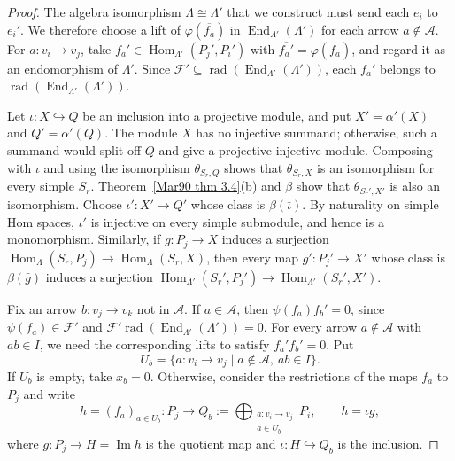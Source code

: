\documentclass[11pt]{article}
\newcommand{\rad}{\operatorname{rad}}
\newcommand{\Hom}{\operatorname{Hom}}
\newcommand{\End}{\operatorname{End}}
\renewcommand{\Im}{\operatorname{Im}}
\renewcommand{\cal}[1]{\mathcal #1}   %
\providecommand{\varLambda}{\Lambda}
\theoremstyle{definition}
\begin{document}
\begin{proof}
			The algebra isomorphism $\varLambda\cong\varLambda'$ that we construct must send each $e_i$ to $e_i'$.
			We therefore choose a lift of $\varphi(\overline{f_a})$ in $\End_{\varLambda'}(\varLambda')$ for each arrow $a\notin\cal{A}$.
			For $a:v_i\to v_j$, take $f_a'\in\Hom_{\varLambda'}(P_j',P_i')$ with $\overline{f_a'}=\varphi(\overline{f_a})$, and regard it as an endomorphism of $\varLambda'$.
			Since $\cal{F}'\subseteq\rad(\End_{\varLambda'}(\varLambda'))$, each $f_a'$ belongs to $\rad(\End_{\varLambda'}(\varLambda'))$.

			Let $\iota:X\hookrightarrow Q$ be an inclusion into a projective module, and put $X'=\alpha'(X)$ and $Q'=\alpha'(Q)$.
			The module $X$ has no injective summand; otherwise, such a summand would split off $Q$ and give a projective-injective module.
			Composing with $\iota$ and using the isomorphism $\theta_{S_r,Q}$ shows that $\theta_{S_r,X}$ is an isomorphism for every simple $S_r$.
			Theorem~\ref{Mar90 thm 3.4}(b) and $\beta$ show that $\theta_{S_r',X'}$ is also an isomorphism.
			Choose $\iota':X'\to Q'$ whose class is $\beta(\bar\iota)$.
			By naturality on simple Hom spaces, $\iota'$ is injective on every simple submodule, and hence is a monomorphism.
			Similarly, if $g:P_j\to X$ induces a surjection $\Hom_{\varLambda}(S_r,P_j)\to\Hom_{\varLambda}(S_r,X)$, then every map $g':P_j'\to X'$ whose class is $\beta(\bar g)$ induces a surjection $\Hom_{\varLambda'}(S_r',P_j')\to\Hom_{\varLambda'}(S_r',X')$.

			Fix an arrow $b:v_j\to v_k$ not in $\cal{A}$.
			If $a\in\cal{A}$, then $\psi(f_a)f_b'=0$, since $\psi(f_a)\in\cal{F}'$ and $\cal{F}'\rad(\End_{\varLambda'}(\varLambda'))=0$.
			For every arrow $a\notin\cal{A}$ with $ab\in I$, we need the corresponding lifts to satisfy $f_a'f_b'=0$.
			Put
			\[
				U_b=\{a:v_i\to v_j\mid a\notin\cal{A},\ ab\in I\}.
			\]
			If $U_b$ is empty, take $x_b=0$.
			Otherwise, consider the restrictions of the maps $f_a$ to $P_j$ and write
			\[
				h=(f_a)_{a\in U_b}:P_j\longrightarrow Q_b:=\bigoplus_{\substack{a:v_i\to v_j\\a\in U_b}}P_i,
				\qquad h=\iota g,
			\]
			where $g:P_j\to H=\Im h$ is the quotient map and $\iota:H\hookrightarrow Q_b$ is the inclusion.


\end{proof}
\end{document}
